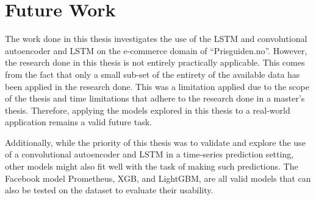 
\section{Future Work}
\label{sections:Discussion:FutureWork}


The work done in this thesis investigates the use of the LSTM and convolutional autoencoder and LSTM
on the e-commerce domain of ``Prisguiden.no''.
However, the research done in this thesis is not entirely practically applicable.
This comes from the fact that only a small sub-set of the entirety of the available data has been applied
in the research done.
This was a limitation applied due to the scope of the thesis and time limitations that adhere to the research done in a master's thesis.
Therefore, applying the models explored in this thesis to a real-world application remains a valid future task.

Additionally, while the priority of this thesis was to validate and explore the use of a convolutional autoencoder and LSTM
in a time-series prediction setting, other models might also fit well with the task of making such predictions.
The Facebook model Prometheus, XGB, and LightGBM,
are all valid models that can also be tested on the dataset to evaluate their usability.




